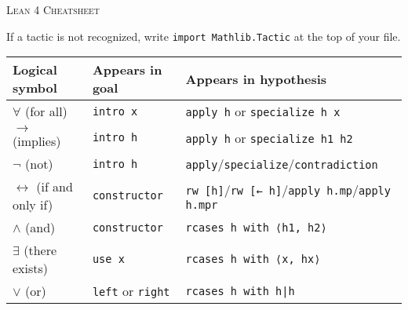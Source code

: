 \documentclass[a4paper]{article}
\newcommand{\lean}[1]{{\tt #1}}
\newcommand{\nv}{\textit{new\_name}\xspace}
\newcommand{\nom}{\textit{name}\xspace}
\newcommand{\expr}{\textit{expr}\xspace}
\begin{document}
\pagestyle{empty}
\begin{center}
 \large\textsc{Lean 4 Cheatsheet}
\end{center}


\begin{center}
If a tactic is not recognized, write \lean{import Mathlib.Tactic} at the top of your file.\smallskip
\setlength\tabcolsep{5mm}
\def\arraystretch{1.3}
\begin{tabular}{@{}lll@{}}
  \toprule
  Logical symbol & Appears in goal & Appears in hypothesis \\
  \midrule
  $\forall$ (for all) & \lean{intro x} & \lean{apply h} or \lean{specialize h x}  \\
  $\to$ (implies) & \lean{intro h} & \lean{apply h} or \lean{specialize h1 h2} \\
  $\neg$ (not) & \lean{intro h} & \lean{apply}/\lean{specialize}/\lean{contradiction}  \\
  $\leftrightarrow$ (if and only if)\qquad & \lean{constructor}  & \lean{rw [h]}/\lean{rw [← h]}/\lean{apply h.mp}/\lean{apply h.mpr}\\
  $\wedge$ (and) & \lean{constructor} & \lean{rcases h with ⟨h1, h2⟩} \\
  $\exists$ (there exists) & \lean{use x} & \lean{rcases h with ⟨x, hx⟩} \\
  $\vee$ (or) & \lean{left} or \lean{right} & \lean{rcases h with h|h} \\
\bottomrule
\end{tabular}
\end{center}

\medskip
\end{document}
